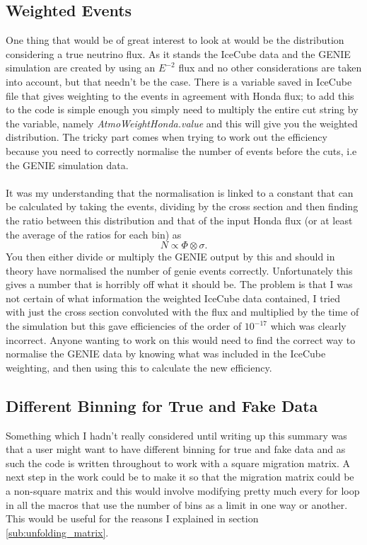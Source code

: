 \documentclass[12pt]{article}
\numberwithin{equation}{section}
\numberwithin{figure}{section}
\begin{document}
\subsection{Weighted Events} %
\label{sub:weighted_events}
One thing that would be of great interest to look at would be the distribution considering a true neutrino flux. As it stands the IceCube data and the GENIE simulation are created by using an $E^{-2}$ flux and no other considerations are taken into account, but that needn't be the case. There is a variable saved in IceCube file that gives weighting to the events in agreement with Honda flux; to add this to the code is simple enough you simply need to multiply the entire cut string by the variable, namely \emph{AtmoWeightHonda.value} and this will give you the weighted distribution. The tricky part comes when trying to work out the efficiency because you need to correctly normalise the number of events before the cuts, i.e the GENIE simulation data.\\
\\
It was my understanding that the normalisation is linked to a constant that can be calculated by taking the events, dividing by the cross section and then finding the ratio between this distribution and that of the input Honda flux (or at least the average of the ratios for each bin) as 
\begin{equation}
	N \propto \Phi \otimes \sigma.
\end{equation} You then either divide or multiply the GENIE output by this and should in theory have normalised the number of genie events correctly. Unfortunately this gives a number that is horribly off what it should be. The problem is that I was not certain of what information the weighted IceCube data contained, I tried with just the cross section convoluted with the flux and multiplied by the time  of the simulation but this gave efficiencies of the order of $10^{-17}$ which was clearly incorrect. Anyone wanting to work on this would need to find the correct way to normalise the GENIE data by knowing what was included in the IceCube weighting, and then using this to calculate the new efficiency.
%
\subsection{Different Binning for True and Fake Data} %
\label{sub:different_binning_for_true_and_fake_data}
Something which I hadn't really considered until writing up this summary was that a user might want to have different binning for true and fake data and as such the code is written throughout to work with a square migration matrix. A next step in the work could be to make it so that the migration matrix could be a non-square matrix and this would involve modifying pretty much every for loop in all the macros that use the number of bins as a limit in one way or another. This would be useful for the reasons I explained in section \ref{sub:unfolding_matrix}.
%
\end{document}
